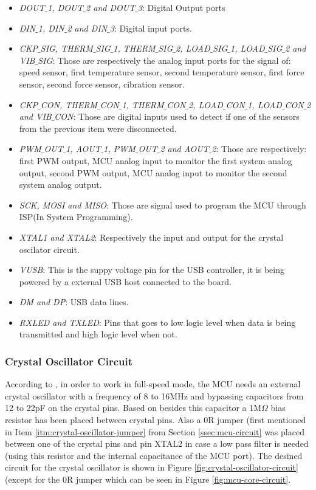 			\begin{itemize}
				\item\textit{DOUT$\_$1, DOUT$\_$2 and DOUT$\_$3}: Digital Output ports	
				\item\textit{DIN$\_$1, DIN$\_$2 and DIN$\_$3}: Digital input ports.
				\item\textit{CKP$\_$SIG, THERM$\_$SIG$\_$1, THERM$\_$SIG$\_$2, LOAD$\_$SIG$\_$1, LOAD$\_$SIG$\_$2 and VIB$\_$SIG}: Those are respectively the analog input ports for the signal of: speed sensor, first temperature sensor, second temperature sensor, first force sensor, second force sensor, cibration sensor.
				\item\textit{CKP$\_$CON, THERM$\_$CON$\_$1, THERM$\_$CON$\_$2, LOAD$\_$CON$\_$1, LOAD$\_$CON$\_$2 and VIB$\_$CON}: Those are digital inputs used to detect if one of the sensors from the previous item were disconnected.
				\item\textit{PWM$\_$OUT$\_$1, AOUT$\_$1, PWM$\_$OUT$\_$2 and AOUT$\_$2}: Those are respectively: first PWM output, MCU analog input to monitor the first system analog output, second PWM output, MCU analog input to monitor the second system analog output.
				\item\textit{SCK, MOSI and MISO}: Those are signal used to program the MCU through ISP(In System Programming).
				\item\textit{XTAL1 and XTAL2}: Respectively the input and output for the crystal oscilator circuit.
				\item\textit{VUSB}: This is the suppy voltage pin for the USB controller, it is being powered by a external USB host connected to the board.
				\item\textit{DM and DP}: USB data lines.
				\item\textit{RXLED and TXLED}: Pins that goes to low logic level when data is being transmitted and high logic level when not.
			\end{itemize}

		\subsubsection{Crystal Oscillator Circuit}\label{sssec:crystal-oscillator-circuit}
			According to \cite{atmega32u4-datasheet}, in order to work in full-speed mode, the MCU needs an external crystal oscillator with a frequency of 8 to 16MHz and bypassing capacitors from 12 to 22pF on the crystal pins. Based on \cite{arduino-leonardo-schematic} besides this capacitor a 1M$\Omega$ bias resistor has been placed between crystal pins. Also a 0R jumper (first mentioned in Item \ref{itm:crystal-oscillator-jumper} from Section \ref{ssec:mcu-circuit} was placed between one of the crystal pins and pin XTAL2 in case a low pass filter is needed (using this resistor and the internal capacitance of the MCU port). The desined circuit for the crystal oscillator is shown in Figure \ref{fig:crystal-oscillator-circuit} (except for the 0R jumper which can be seen in Figure \ref{fig:mcu-core-circuit}.

